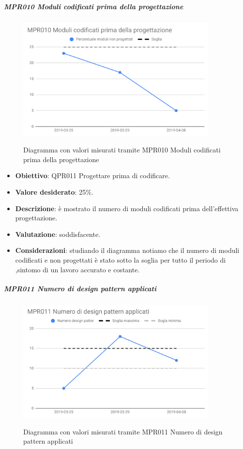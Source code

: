 	\subparagraph{MPR010 Moduli codificati prima della progettazione}
	
	\begin{figure}[H]
		\centering
		\includegraphics[width=0.9\textwidth]{img/cruscotti/RQ/MPR010.png}
		\label{immagineModuliCodificatiRQ}
		\caption{Diagramma con valori misurati tramite MPR010 Moduli codificati prima della progettazione}
	\end{figure}
	
	\begin{itemize}
		\item \textbf{Obiettivo}: QPR011 Progettare prima di codificare.
		\item \textbf{Valore desiderato}: 25\%.
		\item \textbf{Descrizione}: è mostrato il numero di moduli codificati prima dell'effettiva progettazione.
		\item \textbf{Valutazione}: soddisfacente.
		\item \textbf{Considerazioni}: studiando il diagramma notiamo che il numero di moduli codificati e non progettati
		è stato sotto la soglia per tutto il periodo di \RQ,sintomo di un lavoro accurato e costante.
	\end{itemize}

	\subparagraph{MPR011 Numero di design pattern applicati}
	
	\begin{figure}[H]
		\centering
		\includegraphics[width=0.9\textwidth]{img/cruscotti/RQ/MPR011.png}
		\label{immagineNumDesignPatternRQ}
		\caption{Diagramma con valori misurati tramite MPR011 Numero di design pattern applicati}
	\end{figure}
	

